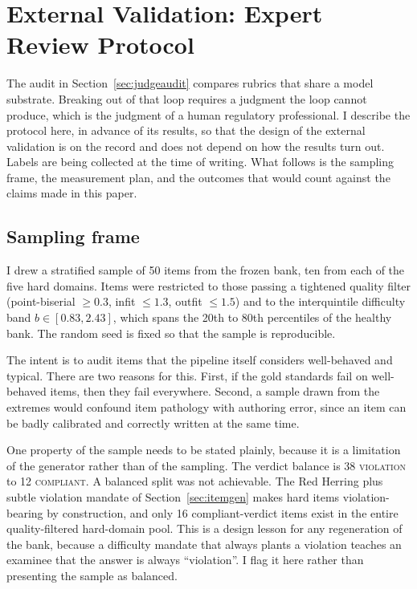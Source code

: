 \section{External Validation: Expert Review Protocol}
\label{sec:expertreview}

The audit in Section~\ref{sec:judgeaudit} compares rubrics that share a
model substrate. Breaking out of that loop requires a judgment the loop
cannot produce, which is the judgment of a human regulatory professional.
I describe the protocol here, in advance of its results, so that the
design of the external validation is on the record and does not depend on
how the results turn out. Labels are being collected at the time of
writing. What follows is the sampling frame, the measurement plan, and
the outcomes that would count against the claims made in this paper.

\subsection{Sampling frame}
I drew a stratified sample of 50 items from the frozen bank, ten from
each of the five hard domains. Items were restricted to those passing a
tightened quality filter (point-biserial $\geq 0.3$, infit $\leq 1.3$,
outfit $\leq 1.5$) and to the interquintile difficulty band
$b \in [0.83, 2.43]$, which spans the 20th to 80th percentiles of the
healthy bank. The random seed is fixed so that the sample is
reproducible.

The intent is to audit items that the pipeline itself considers
well-behaved and typical. There are two reasons for this. First, if the
gold standards fail on well-behaved items, then they fail everywhere.
Second, a sample drawn from the extremes would confound item pathology
with authoring error, since an item can be badly calibrated and correctly
written at the same time.

One property of the sample needs to be stated plainly, because it is a
limitation of the generator rather than of the sampling. The verdict
balance is 38 \textsc{violation} to 12 \textsc{compliant}. A balanced
split was not achievable. The Red Herring plus subtle violation mandate
of Section~\ref{sec:itemgen} makes hard items violation-bearing by
construction, and only 16 compliant-verdict items exist in the entire
quality-filtered hard-domain pool. This is a design lesson for any
regeneration of the bank, because a difficulty mandate that always plants
a violation teaches an examinee that the answer is always ``violation''.
I flag it here rather than presenting the sample as balanced.

